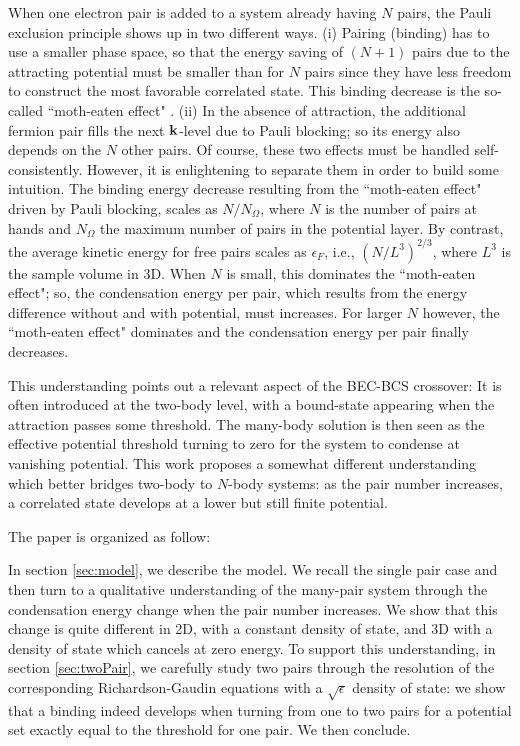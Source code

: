 \documentclass[5p,twocolumn]{elsarticle}
\begin{document}
When one electron pair is added to a system already having $N$ pairs, the Pauli exclusion principle shows up in two different ways.  (i) Pairing (binding) has to use a smaller phase space, so that the energy saving of $(N+1)$ pairs due to the attracting potential must be smaller than for $N$ pairs since they have less freedom to construct the most favorable correlated state.   This binding decrease is the so-called ``moth-eaten effect" \cite{moth}. (ii) In the absence of attraction, the additional fermion pair fills the next $\mathbf{k}$-level due to Pauli blocking; so its energy also depends on the $N$ other pairs.  Of course, these two effects must be handled self-consistently. However, it is enlightening to separate them in order to build some intuition. The binding energy decrease resulting from the ``moth-eaten effect" driven by Pauli blocking, scales as $N/N_\Omega$, where $N$ is the number of pairs at hands and $N_\Omega$ the maximum number of pairs in the potential layer. By contrast, the average kinetic energy for free pairs scales as $\epsilon_F$, i.e., $(N/L^3)^{2/3}$, where $L^{3}$ is the sample volume in 3D. 
When $N$ is small, this dominates the ``moth-eaten effect"; so, the condensation energy per pair, which results from the energy difference without and with potential, must increases.  For larger $N$ however, the ``moth-eaten effect" dominates and the condensation energy per pair finally decreases.

This understanding points out a relevant aspect of the BEC-BCS crossover:  It is often introduced at the two-body level, with a bound-state appearing when the attraction passes some threshold. The many-body solution is then seen as the effective potential threshold turning to zero for the system to condense at vanishing potential. This work proposes a somewhat different understanding which better bridges two-body to $N$-body systems: as the pair number increases, a correlated state develops at a lower but still finite potential.

The paper is organized as follow:

In section \ref{sec:model}, we describe the model. We recall the single pair case and then turn to a qualitative understanding of the many-pair system through the condensation energy change when the pair number increases. We show that this change is quite different in 2D, with a constant density of state, and 3D  with a density of state which cancels at zero energy.  To support this understanding, in section \ref{sec:twoPair}, we carefully study two pairs through the resolution of the corresponding  Richardson-Gaudin equations with a $\sqrt{\epsilon}$ density of state: we show that  a binding indeed develops when turning from one to two pairs for a potential set exactly equal to the threshold for one pair. We then conclude.
\end{document}
